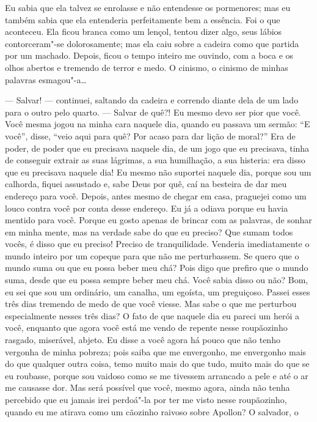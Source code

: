 Eu sabia que ela talvez se enrolasse e não entendesse os pormenores; mas
eu também sabia que ela entenderia perfeitamente bem a essência. Foi o
que aconteceu. Ela ficou branca como um lençol, tentou dizer algo, seus
lábios contorceram"-se dolorosamente; mas ela caiu sobre a cadeira como
que partida por um machado. Depois, ficou o tempo inteiro me ouvindo,
com a boca e os olhos abertos e tremendo de terror e medo. O cinismo, o
cinismo de minhas palavras esmagou"-a\ldots{}

--- Salvar! --- continuei, saltando da cadeira e correndo diante dela de um
lado para o outro pelo quarto. --- Salvar de quê?! Eu mesmo devo ser pior
que você. Você mesma jogou na minha cara naquele dia, quando eu passava
um sermão: “E você”, disse, “veio aqui para quê? Por acaso para dar
lição de moral?” Era de poder, de poder que eu precisava naquele dia,
de um jogo que eu precisava, tinha de conseguir extrair as suas
lágrimas, a sua humilhação, a sua histeria: era disso que eu precisava
naquele dia! Eu mesmo não suportei naquele dia, porque sou um calhorda,
fiquei assustado e, sabe Deus por quê, caí na besteira de dar meu endereço
para você. Depois, antes mesmo de chegar em casa, praguejei como um
louco contra você por conta desse endereço. Eu já a odiava porque eu
havia mentido para você. Porque eu gosto apenas de brincar com as
palavras, de sonhar em minha mente, mas na verdade sabe do que eu
preciso? Que sumam todos vocês, é disso que eu preciso! Preciso de
tranquilidade. Venderia imediatamente o mundo inteiro por um copeque
para que não me perturbassem. Se quero que o mundo suma ou que eu
possa beber meu chá? Pois digo que prefiro que o mundo suma, desde
que eu possa sempre beber meu chá. Você sabia disso ou não? Bom, eu sei
que sou um ordinário, um canalha, um egoísta, um preguiçoso. Passei
esses três dias tremendo de medo de que você viesse. Mas sabe o que me
perturbou especialmente nesses três dias? O fato de que naquele dia eu
pareci um herói a você, enquanto que agora você está me vendo de
repente nesse roupãozinho rasgado, miserável, abjeto. Eu disse a você
agora há pouco que não tenho vergonha de minha pobreza; pois saiba que
me envergonho, me envergonho mais do que qualquer outra coisa, temo
muito mais do que tudo, muito mais do que se eu roubasse, porque sou
vaidoso como se me tivessem arrancado a pele e até o ar me causasse
dor. Mas será possível que você, mesmo agora, ainda não tenha percebido
que eu jamais irei perdoá"-la por ter me visto nesse roupãozinho, quando
eu me atirava como um cãozinho raivoso sobre Apollon? O salvador, o
